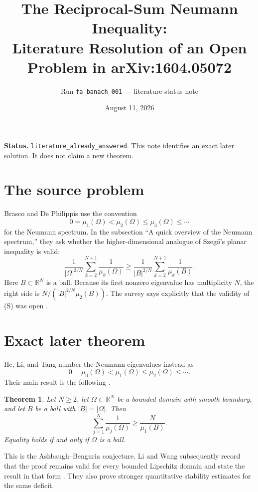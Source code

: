 \documentclass[11pt]{article}
\title{The Reciprocal-Sum Neumann Inequality:\\
Literature Resolution of an Open Problem in arXiv:1604.05072}
\author{Run \texttt{fa\_banach\_001} --- literature-status note}
\date{August 11, 2026}
\newtheorem*{theorem}{Theorem}
\newcommand{\R}{\mathbb R}
\begin{document}
\maketitle

\noindent\textbf{Status.} \texttt{literature\_already\_answered}. This note
identifies an exact later solution. It does not claim a new theorem.

\section*{The source problem}
Brasco and De Philippis use the convention
\[
 0=\mu_1(\Omega)<\mu_2(\Omega)\leq\mu_3(\Omega)\leq\cdots
\]
for the Neumann spectrum.  In the subsection ``A quick overview of the
Neumann spectrum,'' they ask whether the higher-dimensional analogue of
Szeg\H{o}'s planar inequality is valid:
\begin{equation}
 \frac{1}{|\Omega|^{2/N}}
 \sum_{k=2}^{N+1}\frac{1}{\mu_k(\Omega)}
 \geq
 \frac{1}{|B|^{2/N}}
 \sum_{k=2}^{N+1}\frac{1}{\mu_k(B)}.                 \tag{S}
\end{equation}
Here $B\subset\R^N$ is a ball.  Because its first nonzero eigenvalue has
multiplicity $N$, the right side is
$N/(|B|^{2/N}\mu_2(B))$.  The survey says explicitly that the validity of
(S) was open \cite{BD}.

\section*{Exact later theorem}
He, Li, and Tang number the Neumann eigenvalues instead as
\[
 0=\mu_0(\Omega)<\mu_1(\Omega)\leq\mu_2(\Omega)\leq\cdots.
\]
Their main result is the following \cite[Theorem 1.2]{HLT}.

\begin{theorem}
Let $N\geq2$, let $\Omega\subset\R^N$ be a bounded domain with smooth
boundary, and let $B$ be a ball with $|B|=|\Omega|$. Then
\[
 \sum_{j=1}^{N}\frac{1}{\mu_j(\Omega)}
 \geq \frac{N}{\mu_1(B)}.
\]
Equality holds if and only if $\Omega$ is a ball.
\end{theorem}

This is the Ashbaugh--Benguria conjecture.  Li and Wang subsequently record
that the proof remains valid for every bounded Lipschitz domain and state the
result in that form \cite[Theorem 1.1]{LW}.  They also prove stronger
quantitative stability estimates for the same deficit.
\end{document}
